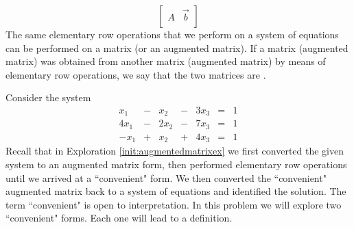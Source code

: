 \documentclass{ximera}
\begin{document}
$$\left[\begin{array}{c|c}  
 A & \vec{b}\\
 \end{array}\right]$$
The same elementary row operations that we perform on a system of equations can be performed on a matrix (or an augmented matrix).  If a matrix (augmented matrix) was obtained from another matrix (augmented matrix) by means of elementary row operations, we say that the two matrices are .  
\begin{exploration}\label{init:backsub}
Consider the system
$$\begin{array}{ccccccc}
      x_1 &- &x_2&-&3x_3&= &1 \\
   4x_1& -&2x_2&-&7x_3&=&1\\
   -x_1& +&x_2&+&4x_3&=&1
    \end{array}$$
Recall that in Exploration \ref{init:augmentedmatrixex} we first converted the given system to an augmented matrix form, then performed elementary row operations until we arrived at a ``convenient" form.  We then converted the ``convenient" augmented matrix back to a system of equations and identified the solution.  The term ``convenient" is open to interpretation.  In this problem we will explore two ``convenient" forms.  Each one will lead to a definition.  


\end{exploration}
\end{document}
